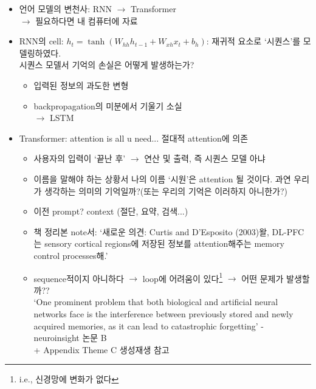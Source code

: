 \documentclass{beamer}
\begin{document}
\begin{frame}
  \begin{itemize}
    \item 언어 모델의 변천사: RNN $\longrightarrow$ Transformer\\
      $\longrightarrow$ 필요하다면 내 컴퓨터에 자료
    \item RNN의 cell: $h_t = \tanh(W_{hh}h_{t-1}+W_{xh}x_t+b_h)$: 재귀적 요소로 `시퀀스'를 모델링하였다.\\
      시퀀스 모델서 기억의 손실은 어떻게 발생하는가?
      \begin{itemize}
        \item 입력된 정보의 과도한 변형
        \item backpropagation의 미분에서 기울기 소실\\
          $\longrightarrow$ LSTM
      \end{itemize}
    \item Transformer: attention is all u need... 절대적 attention에 의존\\
      \begin{itemize}
        \item 사용자의 입력이 `끝난 후' $\rightarrow$ 연산 및 출력, 즉 시퀀스 모델 아냐
        \item 이름을 말해야 하는 상황서 나의 이름 `시원'은 attention 될 것이다. 과연 우리가 생각하는 의미의 기억일까?(또는 우리의 기억은 이러하지 아니한가?)
        \item 이전 prompt? context (절단, 요약, 검색...)
        \item 책 정리본 note서: `새로운 의견: Curtis and D’Esposito (2003)왈, DL-PFC는 sensory cortical regions에 저장된 정보를 attention해주는 memory control processes해.'
        \item sequence적이지 아니하다 $\rightarrow$ loop에 어려움이 있다\footnote{i.e., 신경망에 변화가 없다} $\rightarrow$ 어떤 문제가 발생할까??\\
          `One prominent problem that both biological and artificial neural networks face is the interference between previously stored and newly
          acquired memories, as it can lead to catastrophic forgetting' {- neuroinsight 논문 B}\\
          + Appendix Theme C 생성재생 참고
      \end{itemize}
  \end{itemize}
\end{frame}
\end{document}
